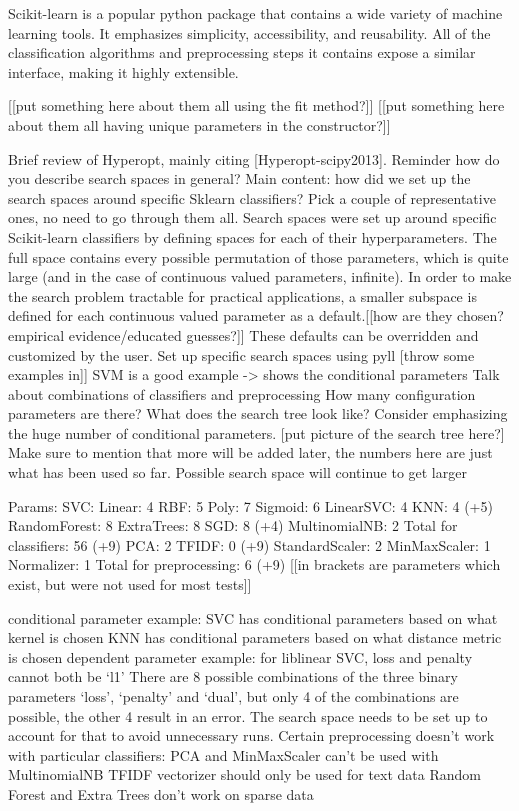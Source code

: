 \documentclass[wcp]{jmlr}
\begin{document}
Scikit-learn is a popular python package that contains a wide variety of machine learning tools. It emphasizes simplicity, accessibility, and reusability. All of the classification algorithms and preprocessing steps it contains expose a similar interface, making it highly extensible. 

[[put something here about them all using the fit method?]]
[[put something here about them all having unique parameters in the constructor?]]

Brief review of Hyperopt, mainly citing [Hyperopt-scipy2013]. Reminder how do you describe search spaces in general?
Main content: how did we set up the search spaces around specific Sklearn classifiers? Pick a couple of representative ones, no need to go through them all.
Search spaces were set up around specific Scikit-learn classifiers by defining spaces for each of their hyperparameters. The full space contains every possible permutation of those parameters, which is quite large (and in the case of continuous valued parameters, infinite). In order to make the search problem tractable for practical applications, a smaller subspace is defined for each continuous valued parameter as a default.[[how are they chosen? empirical evidence/educated guesses?]] These defaults can be overridden and customized by the user. 
Set up specific search spaces using pyll [throw some examples in]]
SVM is a good example -> shows the conditional parameters
Talk about combinations of classifiers and preprocessing
How many configuration parameters are there? What does the search tree look like? Consider emphasizing the huge number of conditional parameters.
[put picture of the search tree here?]
Make sure to mention that more will be added later, the numbers here are just what has been used so far. Possible search space will continue to get larger

Params:
SVC:
Linear: 4
RBF: 5
Poly: 7
Sigmoid: 6
LinearSVC: 4
KNN: 4 (+5)
RandomForest: 8
ExtraTrees: 8
SGD: 8 (+4)
MultinomialNB: 2
Total for classifiers: 56 (+9)
PCA: 2
TFIDF: 0 (+9)
StandardScaler: 2
MinMaxScaler: 1
Normalizer: 1
Total for preprocessing: 6 (+9)
[[in brackets are parameters which exist, but were not used for most tests]]

conditional parameter example:
SVC has conditional parameters based on what kernel is chosen
KNN has conditional parameters based on what distance metric is chosen
dependent parameter example:
for liblinear SVC, loss and penalty cannot both be ‘l1’
There are 8 possible combinations of the three binary parameters ‘loss’, ‘penalty’ and ‘dual’, but only 4 of the combinations are possible, the other 4 result in an error. The search space needs to be set up to account for that to avoid unnecessary runs.
Certain preprocessing doesn’t work with particular classifiers:
PCA and MinMaxScaler can’t be used with MultinomialNB
TFIDF vectorizer should only be used for text data
Random Forest and Extra Trees don’t work on sparse data
\end{document}
